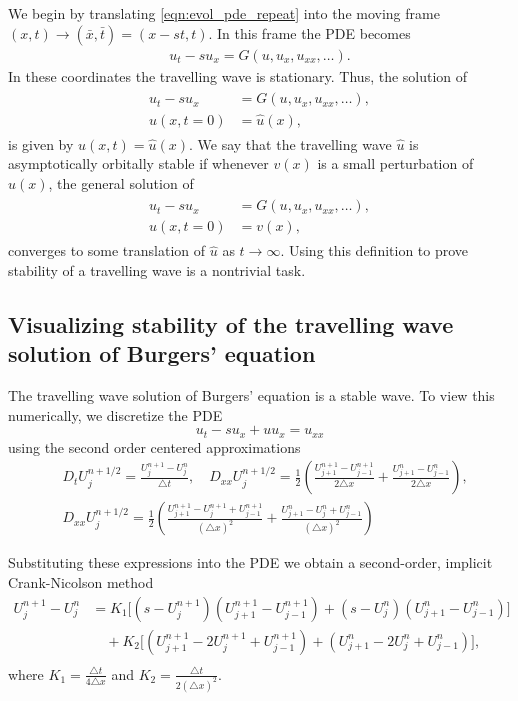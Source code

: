 We begin by translating \eqref{eqn:evol_pde_repeat} into the moving frame $(x,t) \to (\bar{x},\bar{t}) = (x-st, t)$.
In this frame the PDE becomes
\begin{align*}
u_t - su_x = G(u,u_x, u_{xx}, \ldots).
\end{align*}
In these coordinates the travelling wave is stationary.
Thus, the solution of
\begin{align*}
\begin{split}
u_t - su_x &= G(u,u_x, u_{xx}, \ldots), \\
u(x,t = 0) &= \hat{u}(x),
\end{split}
\end{align*}
is given by $u(x,t) = \hat{u}(x)$.
We say that the travelling wave $\hat{u}$ is asymptotically orbitally stable if whenever $v(x)$ is a small perturbation of $\hat{u}(x)$, the general solution of
\begin{align*}
\begin{split}
u_t - su_x &= G(u,u_x, u_{xx}, \ldots), \\
u(x,t = 0) &= v(x),
\end{split}
\end{align*}
converges to some translation of $\hat{u}$ as $t \to \infty$.
Using this definition to prove stability of a travelling wave is a nontrivial task.

\subsection*{Visualizing stability of the travelling wave solution of Burgers' equation}
The travelling wave solution of Burgers' equation is a stable wave.
To view this numerically, we discretize the PDE
\[u_t -su_x + uu_x = u_{xx}\]
using the second order centered approximations
\begin{align*}
&{ } D_t U_j^{n+1/2} = \frac{U_j^{n+1}-U_j^n}{\triangle t}, \quad
D_{xx}U_j^{n+1/2} = \frac{1}{2} \left( \frac{U_{j+1}^{n+1}-U_{j-1}^{n+1}}{2 \triangle x} +  \frac{U_{j+1}^{n}-U_{j-1}^{n}}{2 \triangle x}\right),\\
&{ } D_{xx}U_j^{n+1/2} = \frac{1}{2} \left( \frac{U_{j+1}^{n+1}- U_{j}^{n+1}+U_{j-1}^{n+1}}{(\triangle x)^2} + \frac{U_{j+1}^{n}- U_{j}^{n}+U_{j-1}^{n}}{(\triangle x)^2}\right)
\end{align*}

Substituting these expressions into the PDE we obtain a second-order, implicit Crank-Nicolson method
\begin{align*}
U_j^{n+1} - U_j^n &= K_1 \big[(s - U_j^{n+1})(U_{j+1}^{n+1} - U_{j-1}^{n+1})
+ (s - U_j^n) (U_{j+1}^n - U_{j-1}^n) \big] \\
&{ }  \quad
+ K_2 \big[(U_{j+1}^{n+1} - 2U_j^{n+1}+ U_{j-1}^{n+1}) + (U_{j+1}^n -2U_j^n + U_{j-1}^n) \big],\\
&{ }  \quad
\end{align*}
where $K_1 = \frac{ \triangle t }{4 \triangle x}$ and $K_2 = \frac{ \triangle t}{2(\triangle x)^2}$.

